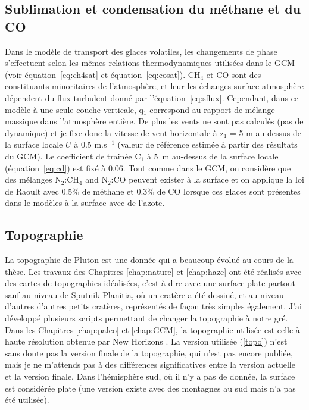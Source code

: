 \subsection{Sublimation et condensation du méthane et du CO}

Dans le modèle de transport des glaces volatiles, les changements de phase s’effectuent selon les mêmes relations thermodynamiques utilisées dans le GCM (voir équation~\ref{eq:ch4sat} et équation~\ref{eq:cosat}). CH$_4$ et CO sont des constituants minoritaires de l’atmosphère, et leur les échanges surface-atmosphère dépendent du flux turbulent donné par l’équation~\ref{eq:sflux}. Cependant, dans ce modèle à une seule couche verticale, q$_1$ correspond au rapport de mélange massique dans l’atmosphère entière. De plus les vents ne sont pas calculés (pas de dynamique) et je fixe donc la vitesse de vent horizontale à z$_1$ = 5 m au-dessus de la surface locale $U$ à 0.5 m.s$^{-1}$ (valeur de référence estimée à partir des résultats du GCM). Le coefficient de trainée C$_1$ à 5~m au-dessus de la surface locale (équation~\ref{eq:cd}) est fixé à 0.06. Tout comme dans le GCM, on considère que des mélanges N$_2$:CH$_4$ and N$_2$:CO peuvent exister à la surface et on applique la loi de Raoult avec 0.5$\%$ de méthane et 0.3$\%$ de CO lorsque ces glaces sont présentes dans le modèles à la surface avec de l’azote. 

\subsection{Topographie}
La topographie de Pluton est une donnée qui a beaucoup évolué au cours de la thèse. Les travaux des Chapitres \ref{chap:nature} et \ref{chap:haze} ont été réalisés avec des cartes de topographies idéalisées, c’est-à-dire avec une surface plate partout sauf au niveau de Sputnik Planitia, où un cratère a été dessiné, et au niveau d’autres d’autres petits cratères, représentés de façon très simples également. J’ai développé plusieurs scripts permettant de changer la topographie à notre gré. 
Dans les Chapitres \ref{chap:paleo} et \ref{chap:GCM}, la topographie utilisée est celle à haute résolution obtenue par New Horizons \citep{Sche:16AGU,Sche:16LPSC}. La version utilisée (\autoref{topo}) n’est sans doute pas la version finale de la topographie, qui n’est pas encore publiée, mais je ne m’attends pas à des différences significatives entre la version actuelle et la version finale. Dans l’hémisphère sud, où il n’y a pas de donnée, la surface est considérée plate (une version existe avec des montagnes au sud mais n’a pas été utilisée).

